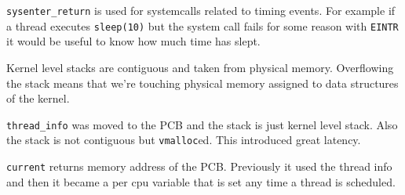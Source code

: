 \documentclass[twoside]{article}
\begin{document}
\texttt{sysenter_return} is used for systemcalls related to timing events. For
example if a thread executes \texttt{sleep(10)} but the system call fails for
some reason with \texttt{EINTR} it would be useful to know how much time has
slept.

Kernel level stacks are contiguous and taken from physical memory. Overflowing
the stack means that we're touching physical memory assigned to data structures
of the kernel.


\texttt{thread_info} was moved to the PCB and the stack is just kernel level
stack. Also the stack is not contiguous but \texttt{vmalloc}ed. This introduced
great latency.

\texttt{current} returns memory address of the PCB. Previously it used the
thread info and then it became a per cpu variable that is set any time a thread
is scheduled.

\newpage


\end{document}
